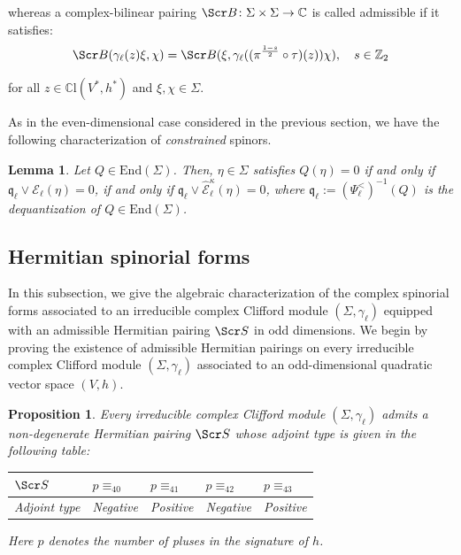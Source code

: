 \documentclass[10pt,a4paper,twoside,reqno]{amsart}
\theoremstyle{plain}
\newtheorem{prop}[thm]{Proposition}
\newtheorem{lemma}[thm]{Lemma}
\theoremstyle{definition}
\theoremstyle{remark}
\newcommand{\End}{\mathrm{End}}
\def\C{\mathbb{C}}
\def\scB{\Scr B}
\def\scS{\Scr S}
\def\cE{\mathcal{E}}
\def\hcE{\widehat{\mathcal{E}}}
\begin{document}
\noindent
whereas a complex-bilinear pairing $\scB\colon\Sigma\times\Sigma\to\C$  is called admissible if it satisfies:
\begin{equation*} 
\scB(\gamma_\ell(z)\xi,\chi)=\scB(\xi,\gamma_\ell((\pi^{\frac{1-s}{2}}\circ\tau)(z))\chi),\quad s\in\mathbb{Z}_2
\end{equation*} 

\noindent
for all $z\in\C\mathrm{l}(V^*,h^*)$ and $\xi,\chi\in\Sigma$.\medskip

As in the even-dimensional case considered in the previous section, we have the following characterization of \emph{constrained} spinors.

\begin{lemma}
\label{lemma:constrainedspinorodd}
Let $Q\in \End(\Sigma)$. Then, $\eta\in \Sigma$ satisfies $Q(\eta) = 0$ if and only if $\mathfrak{q}_\ell\vee \cE_{\ell}(\eta) = 0$, if and only if $\mathfrak{q}_\ell\vee \hcE^{\kappa}_{\ell}(\eta) = 0$, where $\mathfrak{q}_\ell:=(\Psi_\ell^<)^{-1}(Q)$ is the \emph{dequantization} of $Q\in \End(\Sigma)$.
\end{lemma}


\subsection{Hermitian spinorial forms}


In this subsection, we give the algebraic characterization of the complex spinorial forms associated to an irreducible complex Clifford module $(\Sigma,\gamma_\ell)$ equipped with an admissible Hermitian pairing $\scS$ in odd dimensions. We begin by proving the existence of admissible Hermitian pairings on every irreducible complex Clifford module $(\Sigma,\gamma_\ell)$ associated to an odd-dimensional quadratic vector space $(V,h)$.

\begin{prop}
\label{prop:Hermitian_admissibleodd}
Every irreducible complex Clifford module $(\Sigma,\gamma_\ell)$ admits a non-degenerate Hermitian pairing $\scS$ whose adjoint type is given in the following table:
\begin{table}[H]
\centering
\begin{tabular}{l|llll}
\hline
$\scS $&$p\equiv_40$&$p\equiv_41$&$p\equiv_42$&$p\equiv_43$\\
\hline
Adjoint type&Negative&Positive&Negative&Positive\\
\hline
\end{tabular}
\end{table}

\noindent
Here $p$ denotes the number of pluses in the signature of $h$.
\end{prop}
\end{document}

